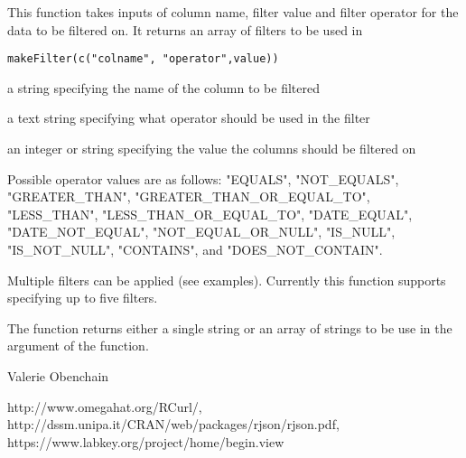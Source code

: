 \documentclass{article}
\begin{document}
\begin{Description}\relax
This function takes inputs of column name, filter value and filter operator for
the data to be filtered on. It returns an array of filters to be used in 
\end{Description}
\begin{Usage}
\begin{verbatim}
makeFilter(c("colname", "operator",value))
\end{verbatim}
\end{Usage}
\begin{Arguments}
\begin{ldescription}
\item[\code{colname}] a string specifying the name of the column to be filtered
\item[\code{operator}] a text string specifying what operator should be used in the filter
\item[\code{value}] an integer or string specifying the value the columns should be filtered on
\end{ldescription}
\end{Arguments}
\begin{Details}\relax
Possible operator values are as follows:
"EQUALS", "NOT\_EQUALS", "GREATER\_THAN", "GREATER\_THAN\_OR\_EQUAL\_TO", "LESS\_THAN",
"LESS\_THAN\_OR\_EQUAL\_TO", "DATE\_EQUAL", "DATE\_NOT\_EQUAL", "NOT\_EQUAL\_OR\_NULL",
"IS\_NULL", "IS\_NOT\_NULL", "CONTAINS", and "DOES\_NOT\_CONTAIN".

Multiple filters can be applied (see examples). Currently this function supports
specifying up to five filters.
\end{Details}
\begin{Value}
The function returns either a single string or an array of strings to be use in the
 argument of the  function.
\end{Value}
\begin{Author}\relax
Valerie Obenchain
\end{Author}
\begin{References}\relax
http://www.omegahat.org/RCurl/, 
http://dssm.unipa.it/CRAN/web/packages/rjson/rjson.pdf,
https://www.labkey.org/project/home/begin.view
\end{References}
\begin{SeeAlso}\relax
{}
\end{SeeAlso}
\end{document}
